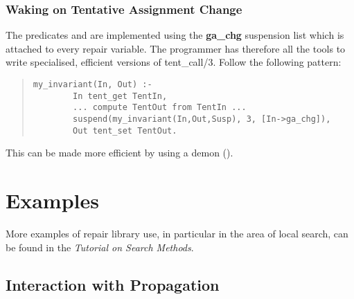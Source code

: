 \subsubsection{Waking on Tentative Assignment Change}
The predicates  and  are implemented
using the {\bf ga_chg} suspension list which is attached to every
repair variable. The programmer has therefore all the tools to write
specialised, efficient versions of tent_call/3.
Follow the following pattern:
\begin{quote} \begin{verbatim}
my_invariant(In, Out) :-
        In tent_get TentIn,
        ... compute TentOut from TentIn ...
        suspend(my_invariant(In,Out,Susp), 3, [In->ga_chg]),
        Out tent_set TentOut.
\end{verbatim} \end{quote}
This can be made more efficient by using a demon ().


\section{Examples}
More examples of repair library use, in particular in the area
of local search, can be found in the {\em Tutorial on Search Methods}.

\subsection{Interaction with Propagation}

